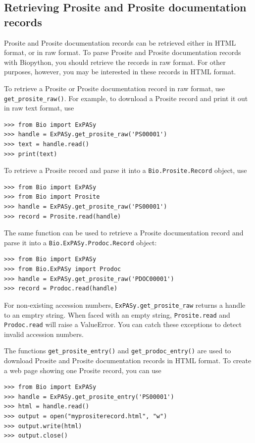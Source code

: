\documentclass{report}
\begin{document}
\subsection{Retrieving Prosite and Prosite documentation records}

Prosite and Prosite documentation records can be retrieved either in HTML format, or in raw format. To parse Prosite and Prosite documentation records with Biopython, you should retrieve the records in raw format. For other purposes, however, you may be interested in these records in HTML format.

To retrieve a Prosite or Prosite documentation record in raw format, use \verb|get_prosite_raw()|. For example, to download a Prosite record and print it out in raw text format, use

\begin{verbatim}
>>> from Bio import ExPASy
>>> handle = ExPASy.get_prosite_raw('PS00001')
>>> text = handle.read()
>>> print(text)
\end{verbatim}

To retrieve a Prosite record and parse it into a \verb|Bio.Prosite.Record| object, use

\begin{verbatim}
>>> from Bio import ExPASy
>>> from Bio import Prosite
>>> handle = ExPASy.get_prosite_raw('PS00001')
>>> record = Prosite.read(handle)
\end{verbatim}

The same function can be used to retrieve a Prosite documentation record and parse it into a \verb|Bio.ExPASy.Prodoc.Record| object:

\begin{verbatim}
>>> from Bio import ExPASy
>>> from Bio.ExPASy import Prodoc
>>> handle = ExPASy.get_prosite_raw('PDOC00001')
>>> record = Prodoc.read(handle)
\end{verbatim}

For non-existing accession numbers, \verb|ExPASy.get_prosite_raw| returns a handle to an emptry string. When faced with an empty string, \verb|Prosite.read| and \verb|Prodoc.read| will raise a ValueError. You can catch these exceptions to detect invalid accession numbers.

The functions \verb|get_prosite_entry()| and \verb|get_prodoc_entry()| are used to download Prosite and Prosite documentation records in HTML format. To create a web page showing one Prosite record, you can use

\begin{verbatim}
>>> from Bio import ExPASy
>>> handle = ExPASy.get_prosite_entry('PS00001')
>>> html = handle.read()
>>> output = open("myprositerecord.html", "w")
>>> output.write(html)
>>> output.close()
\end{verbatim}
\end{document}
